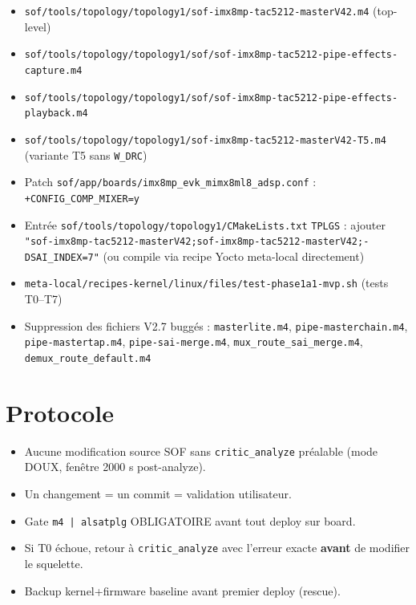 \documentclass[11pt,a4paper]{article}
\begin{document}
\begin{itemize}[leftmargin=*, itemsep=1pt]
  \item \texttt{sof/tools/topology/topology1/sof-imx8mp-tac5212-masterV42.m4} (top-level)
  \item \texttt{sof/tools/topology/topology1/sof/sof-imx8mp-tac5212-pipe-effects-capture.m4}
  \item \texttt{sof/tools/topology/topology1/sof/sof-imx8mp-tac5212-pipe-effects-playback.m4}
  \item \texttt{sof/tools/topology/topology1/sof-imx8mp-tac5212-masterV42-T5.m4} (variante T5 sans \texttt{W\_DRC})
  \item Patch \texttt{sof/app/boards/imx8mp\_evk\_mimx8ml8\_adsp.conf} : \texttt{+CONFIG\_COMP\_MIXER=y}
  \item Entrée \texttt{sof/tools/topology/topology1/CMakeLists.txt} \texttt{TPLGS} : ajouter \texttt{"sof-imx8mp-tac5212-masterV42;sof-imx8mp-tac5212-masterV42;-DSAI\_INDEX=7"} (ou compile via recipe Yocto meta-local directement)
  \item \texttt{meta-local/recipes-kernel/linux/files/test-phase1a1-mvp.sh} (tests T0--T7)
  \item Suppression des fichiers V2.7 buggés : \texttt{masterlite.m4}, \texttt{pipe-masterchain.m4}, \texttt{pipe-mastertap.m4}, \texttt{pipe-sai-merge.m4}, \texttt{mux\_route\_sai\_merge.m4}, \texttt{demux\_route\_default.m4}
\end{itemize}

\section{Protocole}

\begin{itemize}[leftmargin=*, itemsep=1pt]
  \item Aucune modification source SOF sans \texttt{critic\_analyze} préalable (mode DOUX, fenêtre 2000 s post-analyze).
  \item Un changement = un commit = validation utilisateur.
  \item Gate \texttt{m4 | alsatplg} OBLIGATOIRE avant tout deploy sur board.
  \item Si T0 échoue, retour à \texttt{critic\_analyze} avec l'erreur exacte \textbf{avant} de modifier le squelette.
  \item Backup kernel+firmware baseline avant premier deploy (rescue).
\end{itemize}
\end{document}
